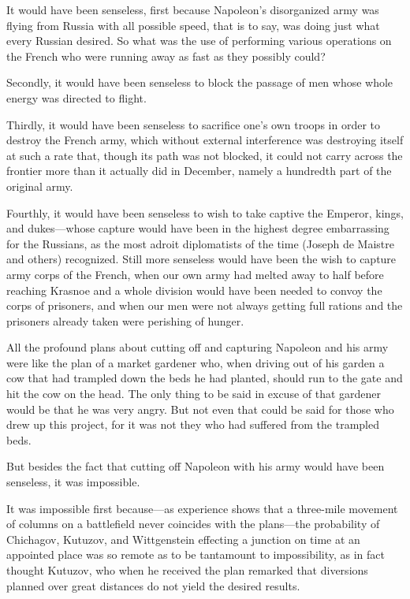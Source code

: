 It would have been senseless, first because Napoleon's
disorganized army was flying from Russia with all possible speed,
that is to say, was doing just what every Russian desired. So
what was the use of performing various operations on the French
who were running away as fast as they possibly could?

Secondly, it would have been senseless to block the passage of
men whose whole energy was directed to flight.

Thirdly, it would have been senseless to sacrifice one's own
troops in order to destroy the French army, which without
external interference was destroying itself at such a rate that,
though its path was not blocked, it could not carry across the
frontier more than it actually did in December, namely a
hundredth part of the original army.

Fourthly, it would have been senseless to wish to take captive
the Emperor, kings, and dukes---whose capture would have been in
the highest degree embarrassing for the Russians, as the most
adroit diplomatists of the time (Joseph de Maistre and others)
recognized. Still more senseless would have been the wish to
capture army corps of the French, when our own army had melted
away to half before reaching Krasnoe and a whole division would
have been needed to convoy the corps of prisoners, and when our
men were not always getting full rations and the prisoners
already taken were perishing of hunger.

All the profound plans about cutting off and capturing Napoleon
and his army were like the plan of a market gardener who, when
driving out of his garden a cow that had trampled down the beds
he had planted, should run to the gate and hit the cow on the
head. The only thing to be said in excuse of that gardener would
be that he was very angry. But not even that could be said for
those who drew up this project, for it was not they who had
suffered from the trampled beds.

But besides the fact that cutting off Napoleon with his army
would have been senseless, it was impossible.

It was impossible first because---as experience shows that a
three-mile movement of columns on a battlefield never coincides
with the plans---the probability of Chichagov, Kutuzov, and
Wittgenstein effecting a junction on time at an appointed place
was so remote as to be tantamount to impossibility, as in fact
thought Kutuzov, who when he received the plan remarked that
diversions planned over great distances do not yield the desired
results.

